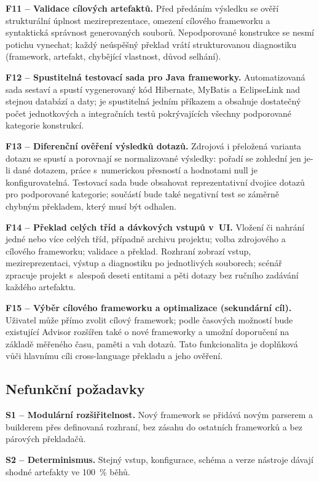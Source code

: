 \documentclass{article}
\begin{document}
\textbf{F11 -- Validace cílových artefaktů.} Před předáním výsledku se ověří strukturální úplnost mezireprezentace, omezení cílového frameworku a syntaktická správnost generovaných souborů. Nepodporované konstrukce se nesmí potichu vynechat; každý neúspěšný překlad vrátí strukturovanou diagnostiku (framework, artefakt, chybějící vlastnost, důvod selhání).

\textbf{F12 -- Spustitelná testovací sada pro Java frameworky.} Automatizovaná sada sestaví a spustí vygenerovaný kód Hibernate, MyBatis a EclipseLink nad stejnou databází a daty; je spustitelná jedním příkazem a obsahuje dostatečný počet jednotkových a integračních testů pokrývajících všechny podporované kategorie konstrukcí.

\textbf{F13 -- Diferenční ověření výsledků dotazů.} Zdrojová i přeložená varianta dotazu se spustí a porovnají se normalizované výsledky: pořadí se zohlední jen je-li dané dotazem, práce s~numerickou přesností a hodnotami null je konfigurovatelná. Testovací sada bude obsahovat reprezentativní dvojice dotazů pro podporované kategorie; součástí bude také negativní test se záměrně chybným překladem, který musí být odhalen.

\textbf{F14 -- Překlad celých tříd a dávkových vstupů v~UI.} Vložení či nahrání jedné nebo více celých tříd, případně archivu projektu; volba zdrojového a cílového frameworku; validace a překlad. Rozhraní zobrazí vstup, mezireprezentaci, výstup a diagnostiku po jednotlivých souborech; scénář zpracuje projekt s~alespoň deseti entitami a pěti dotazy bez ručního zadávání každého artefaktu.

\textbf{F15 -- Výběr cílového frameworku a optimalizace (sekundární cíl).} Uživatel může přímo zvolit cílový framework; podle časových možností bude existující Advisor rozšířen také o nové frameworky a umožní doporučení na základě měřeného času, paměti a vah dotazů. Tato funkcionalita je doplňková vůči hlavnímu cíli cross-language překladu a jeho ověření.

\subsection{Nefunkční požadavky}

\textbf{S1 -- Modulární rozšiřitelnost.} Nový framework se přidává novým parserem a builderem přes definovaná rozhraní, bez zásahu do ostatních frameworků a bez párových překladačů.

\textbf{S2 -- Determinismus.} Stejný vstup, konfigurace, schéma a verze nástroje dávají shodné artefakty ve 100~\% běhů.
\end{document}
